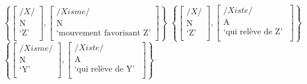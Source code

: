 \documentclass[output=paper]{langsci/langscibook}
\begin{document}
\begin{exe}
\ex\label{exe:pacu1}
\ex\label{exe:pacu2}
{\small$ \left \{ \begin{bmatrix} /X/ \\ \text{N} \\ \text{`Z'} \\ \end{bmatrix}, \begin{bmatrix} /Xisme/ \\ \text{N} \\ \text{`mouvement favorisant Z'}\\ \end{bmatrix}  \right \} $}
\ex\label{exe:pacu3}
{\small$ \left \{ \begin{bmatrix} /X/ \\ \text{N} \\ \text{`Z'} \\ \end{bmatrix},  \begin{bmatrix} /Xiste/ \\ \text{A} \\ \text{`qui relève de Z' }  \\ \end{bmatrix} \right \} $}
\ex\label{exe:pacu4}
{\small$ \left \{  \begin{bmatrix} /Xisme/ \\ \text{N} \\ \text{`Y'} \\ \end{bmatrix}, \begin{bmatrix} /Xiste/ \\ \text{A} \\ \text{`qui relève de Y' } \\ \end{bmatrix} \right \} $}
\end{exe}
\end{document}
